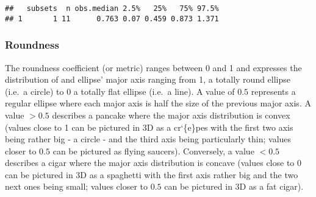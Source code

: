 \documentclass[
]{book}
\newenvironment{Shaded}{\begin{snugshade}}{\end{snugshade}}
\newcommand{\AttributeTok}[1]{\textcolor[rgb]{0.13,0.29,0.53}{#1}}
\newcommand{\ConstantTok}[1]{\textcolor[rgb]{0.56,0.35,0.01}{#1}}
\newcommand{\ControlFlowTok}[1]{\textcolor[rgb]{0.13,0.29,0.53}{\textbf{#1}}}
\newcommand{\DecValTok}[1]{\textcolor[rgb]{0.00,0.00,0.81}{#1}}
\newcommand{\DocumentationTok}[1]{\textcolor[rgb]{0.56,0.35,0.01}{\textbf{\textit{#1}}}}
\newcommand{\FunctionTok}[1]{\textcolor[rgb]{0.13,0.29,0.53}{\textbf{#1}}}
\newcommand{\NormalTok}[1]{#1}
\newcommand{\OtherTok}[1]{\textcolor[rgb]{0.56,0.35,0.01}{#1}}
\newcommand{\SpecialCharTok}[1]{\textcolor[rgb]{0.81,0.36,0.00}{\textbf{#1}}}
\newcommand{\StringTok}[1]{\textcolor[rgb]{0.31,0.60,0.02}{#1}}
\begin{document}
\begin{Shaded}
\end{Shaded}

\begin{verbatim}
##   subsets  n obs.median 2.5%   25%   75% 97.5%
## 1       1 11      0.763 0.07 0.459 0.873 1.371
\end{verbatim}

\hypertarget{roundness}{%
\subsubsection{Roundness}\label{roundness}}

The roundness coefficient (or metric) ranges between 0 and 1 and expresses the distribution of and ellipse' major axis ranging from 1, a totally round ellipse (i.e.~a circle) to 0 a totally flat ellipse (i.e.~a line). A value of \(0.5\) represents a regular ellipse where each major axis is half the size of the previous major axis. A value \(> 0.5\) describes a pancake where the major axis distribution is convex (values close to 1 can be pictured in 3D as a cr`\{e\}pes with the first two axis being rather big - a circle - and the third axis being particularly thin; values closer to \(0.5\) can be pictured as flying saucers). Conversely, a value \(< 0.5\) describes a cigar where the major axis distribution is concave (values close to 0 can be pictured in 3D as a spaghetti with the first axis rather big and the two next ones being small; values closer to \(0.5\) can be pictured in 3D as a fat cigar).
\end{document}
